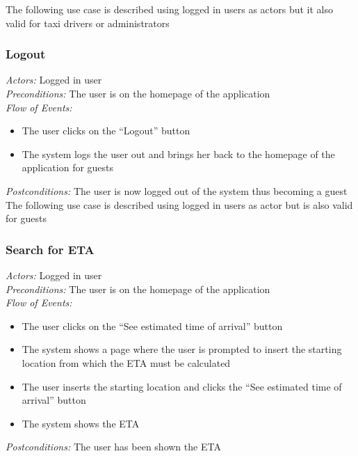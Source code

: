 \documentclass{article}
\begin{document}
The following use case is described using logged in users as actors but it also valid for taxi drivers or administrators
\subsubsection{Logout}
\textit{Actors:} Logged in user
\\\textit{Preconditions:} The user is on the homepage of the application
\\\textit{Flow of Events:}
\begin{itemize}
	\item  The user clicks on the ``Logout'' button
	\item  The system logs the user out and brings her back to the homepage of the application for guests
\end{itemize}
\textit{Postconditions:} The user is now logged out of the system thus becoming a guest
\\
The following use case is described using logged in users as actor but is also valid for guests
\subsubsection{Search for ETA}
\textit{Actors:} Logged in user
\\\textit{Preconditions:} The user is on the homepage of the application
\\\textit{Flow of Events:}
\begin{itemize}
	\item  The user clicks on the ``See estimated time of arrival'' button
	\item  The system shows a page where the user is prompted to insert the starting location from which the ETA must be calculated
	\item  The user inserts the starting location and clicks the ``See estimated time of arrival'' button
	\item  The system shows the ETA 
\end{itemize}
\textit{Postconditions:} The user has been shown the ETA
\end{document}
